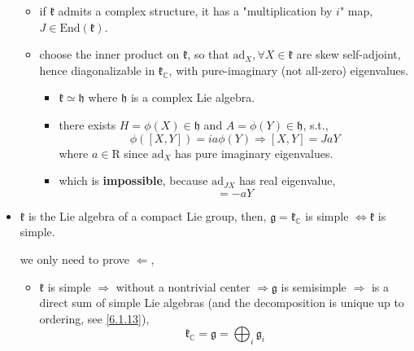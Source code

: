 \begin{itemize}
	\begin{tcolorbox}[title=proof:]
		\begin{itemize}
			\item if $\mathfrak{k}$ admits a complex structure, it has a "multiplication by $i$" map, $J \in \mathrm{End}(\mathfrak{k})$.
			
			\item choose the inner product on $\mathfrak{k}$, so that $\mathrm{ad}_X, \forall X \in\mathfrak{k}$ are skew self-adjoint, hence diagonalizable in $\mathfrak{k}_\mathbb{C}$, with pure-imaginary (not all-zero) eigenvalues.
			\begin{itemize}
				\item $\mathfrak{k} \simeq \mathfrak{h}$ where $\mathfrak{h}$ is a complex Lie algebra.
				
				\item there exists $H = \phi(X) \in \mathfrak{h}$ and $A = \phi(Y) \in \mathfrak{h}$, s.t.,
				\begin{equation}
					\phi([X, Y]) = i a \phi(Y) \Longrightarrow [X, Y] = J a Y
				\end{equation}
				where $a \in \mathrm{R}$ since $\mathrm{ad}_X$ has pure imaginary eigenvalues.
				
				\item which is \textbf{impossible}, because $\mathrm{ad}_{J X}$ has real eigenvalue,
				\begin{equation}
					[J X, Y] = - a Y
				\end{equation}
			\end{itemize}
		\end{itemize}
	\end{tcolorbox}
	
	\item $\mathfrak{k}$ is the Lie algebra of a compact Lie group, then, $\mathfrak{g} = \mathfrak{k}_\mathbb{C}$ is simple $\iff \mathfrak{k}$ is simple.
	
	\begin{tcolorbox}[title=proof:]
		we only need to prove $\Longleftarrow$,
		\begin{itemize}
			\item $\mathfrak{k}$ is simple $\Longrightarrow$ without a nontrivial center $\Longrightarrow \mathfrak{g}$ is semisimple $\Longrightarrow$ is a direct sum of simple Lie algebras (and the decomposition is unique up to ordering, see \eqref{6.1.13}),
			\begin{equation}
				\mathfrak{k}_\mathbb{C} = \mathfrak{g} = \bigoplus_i \mathfrak{g}_i
			\end{equation}
			

\end{itemize}
\end{tcolorbox}
\end{itemize}
